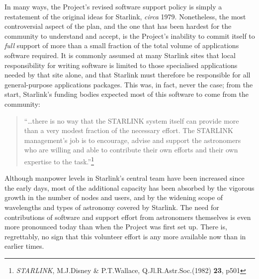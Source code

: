 \documentclass[nolof,11pt,noabs]{starlink}
\begin{document}
In many ways, the Project's revised software support policy
is simply a restatement of the original ideas for Starlink,
\textit{circa} 1979.  Nonetheless, the most controversial
aspect of the plan, and the one that has been hardest for
the community to understand and accept, is the Project's inability
to commit itself to \textit{full} support of more than a
small fraction of the total volume of applications software required.
It is commonly assumed at many Starlink sites
that local responsibility for writing software is limited to
those specialised applications needed by that site alone, and that
Starlink must therefore be responsible for all general-purpose
applications packages.  This was, in fact, never the case;
from the start, Starlink's funding bodies expected most of this software to
come from the community:
\begin{quotation}
``\ldots there is no way that the {\small STARLINK} system itself
can provide more than a very modest fraction of the necessary
effort.  The {\small STARLINK} management's job is to
encourage, advise and support the astronomers who are willing and
able to contribute their own efforts and their own expertise to the
task.''\footnote{\textit{STARLINK}, M.J.Disney \& P.T.Wallace,
Q.Jl.R.Astr.Soc.(1982) \textbf{23}, p501}
\end{quotation}
Although manpower levels in Starlink's central
team have been increased since
the early days, most of the additional capacity has been absorbed
by the vigorous growth in the number of nodes and
users, and by the widening scope of wavelengths and types
of astronomy covered by Starlink.  The need for contributions of
software and support effort from astronomers themselves
is even more pronounced today than when the Project was first
set up.  There is, regrettably, no sign that this volunteer
effort is any more available now than in earlier times.
\end{document}
